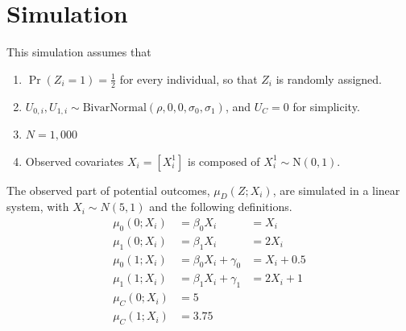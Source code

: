 \documentclass[a4paper, 12pt]{article}                                     %
\renewcommand{\vec}[1]{\boldsymbol{\mathit{#1}}}                           %
\newcommand{\Prob}[1]{\Pr\left( #1 \right)}                         %
\begin{document}
\section{Simulation}
This simulation assumes that
\begin{enumerate}
    \item $\Prob{Z_i = 1} = \frac12$ for every individual, so that $Z_i$ is randomly assigned.
    \item $U_{0,i}, U_{1,i} \sim \text{BivarNormal}(\rho, 0, 0, \sigma_0, \sigma_1)$, and $U_C = 0$ for simplicity.
    \item $N = 1,000$
    \item Observed covariates $\vec X_i = \left[ X^1_i \right]$ is composed of $X^1_i \sim \text{N}(0, 1)$.
\end{enumerate}

The observed part of potential outcomes, $\mu_D(Z; \vec X_i)$, are simulated in a linear system, with $\vec X_i \sim N(5, 1)$ and the following definitions.
\begin{align*}
    \mu_0(0; \vec X_i) &= \beta_0 \vec X_i            &= \vec X_i \\
    \mu_1(0; \vec X_i) &= \beta_1 \vec X_i            &= 2 \vec X_i \\
    \mu_0(1; \vec X_i) &= \beta_0 \vec X_i + \gamma_0 &= \vec X_i + 0.5 \\
    \mu_1(1; \vec X_i) &= \beta_1 \vec X_i + \gamma_1 &= 2 \vec X_i + 1 \\
    \mu_C(0; \vec X_i) &= 5 \\
    \mu_C(1; \vec X_i) &= 3.75
\end{align*}
\end{document}
